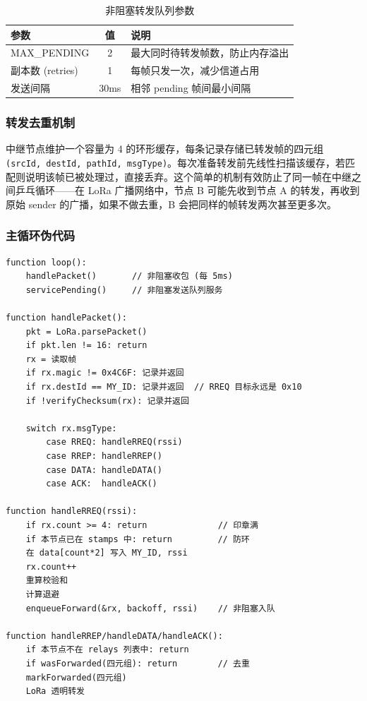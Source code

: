 \documentclass[12pt,a4paper]{ctexart}
\newcommand{\tblheaderstyle}{\sffamily\small\color{white}}
\begin{document}
\begin{table}[htbp]
\centering
\caption{非阻塞转发队列参数}
\begin{tabularx}{\textwidth}{l c >{\raggedright\arraybackslash}X}
\toprule
\rowcolor{tblhead}\tblheaderstyle 参数 & \tblheaderstyle 值 & \tblheaderstyle 说明 \\
\midrule
MAX\_PENDING     & 2    & 最大同时待转发帧数，防止内存溢出 \\
副本数 (retries) & 1    & 每帧只发一次，减少信道占用 \\
发送间隔         & 30ms & 相邻 pending 帧间最小间隔 \\
\bottomrule
\end{tabularx}
\end{table}

\subsubsection{转发去重机制}

中继节点维护一个容量为 4 的环形缓存，每条记录存储已转发帧的四元组 \texttt{(srcId, destId, pathId, msgType)}。每次准备转发前先线性扫描该缓存，若匹配则说明该帧已被处理过，直接丢弃。这个简单的机制有效防止了同一帧在中继之间乒乓循环——在 LoRa 广播网络中，节点 B 可能先收到节点 A 的转发，再收到原始 sender 的广播，如果不做去重，B 会把同样的帧转发两次甚至更多次。

\subsubsection{主循环伪代码}

\begin{lstlisting}[]
function loop():
    handlePacket()       // 非阻塞收包 (每 5ms)
    servicePending()     // 非阻塞发送队列服务

function handlePacket():
    pkt = LoRa.parsePacket()
    if pkt.len != 16: return
    rx = 读取帧
    if rx.magic != 0x4C6F: 记录并返回
    if rx.destId == MY_ID: 记录并返回  // RREQ 目标永远是 0x10
    if !verifyChecksum(rx): 记录并返回

    switch rx.msgType:
        case RREQ: handleRREQ(rssi)
        case RREP: handleRREP()
        case DATA: handleDATA()
        case ACK:  handleACK()

function handleRREQ(rssi):
    if rx.count >= 4: return              // 印章满
    if 本节点已在 stamps 中: return         // 防环
    在 data[count*2] 写入 MY_ID, rssi
    rx.count++
    重算校验和
    计算退避
    enqueueForward(&rx, backoff, rssi)    // 非阻塞入队

function handleRREP/handleDATA/handleACK():
    if 本节点不在 relays 列表中: return
    if wasForwarded(四元组): return        // 去重
    markForwarded(四元组)
    LoRa 透明转发
\end{lstlisting}
\end{document}
